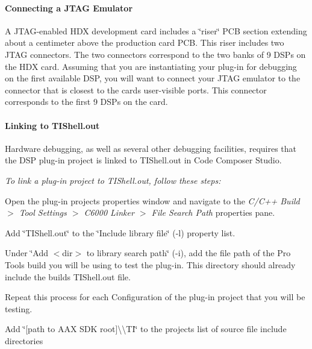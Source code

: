 \hypertarget{a00362_subsubsection__connecting_a_jtag_emulator}{}\paragraph{Connecting a J\+T\+A\+G Emulator}\label{a00362_subsubsection__connecting_a_jtag_emulator}
 A J\+T\+A\+G-\/enabled H\+D\+X development card includes a \char`\"{}riser\char`\"{} P\+C\+B section extending about a centimeter above the production card P\+C\+B. This riser includes two J\+T\+A\+G connectors. The two connectors correspond to the two banks of 9 D\+S\+Ps on the H\+D\+X card. Assuming that you are instantiating your plug-\/in for debugging on the first available D\+S\+P, you will want to connect your J\+T\+A\+G emulator to the connector that is closest to the card\textquotesingle{}s user-\/visible ports. This connector corresponds to the first 9 D\+S\+Ps on the card.

\hypertarget{a00362_subsubsection__linking_to_tishellout_}{}\paragraph{Linking to T\+I\+Shell.\+out}\label{a00362_subsubsection__linking_to_tishellout_}
 Hardware debugging, as well as several other debugging facilities, requires that the D\+S\+P plug-\/in project is linked to T\+I\+Shell.\+out in Code Composer Studio.

{\itshape  To link a plug-\/in project to T\+I\+Shell.\+out, follow these steps\+:} 
\begin{DoxyEnumerate}
\item Open the plug-\/in project\textquotesingle{}s properties window and navigate to the {\itshape C/\+C++ Build $>$ Tool Settings $>$ C6000 Linker $>$ File Search Path} properties pane.  
\item Add \char`\"{}\+T\+I\+Shell.\+out\char`\"{} to the \char`\"{}\+Include library file\char`\"{} ({\ttfamily -\/l}) property list.  
\item Under \char`\"{}\+Add $<$dir$>$ to library search path\char`\"{} ({\ttfamily -\/i}), add the file path of the Pro Tools build you will be using to test the plug-\/in. This directory should already include the build\textquotesingle{}s T\+I\+Shell.\+out file.  
\item Repeat this process for each Configuration of the plug-\/in project that you will be testing.  
\item Add \char`\"{}\mbox{[}path to A\+A\+X S\+D\+K root\mbox{]}\textbackslash{}\textbackslash{}\+T\+I\char`\"{} to the project\textquotesingle{}s list of source file include directories  
\end{DoxyEnumerate}

